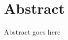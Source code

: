 \documentclass[thesis.tex]{subfiles}
\begin{document}
\null\vfill
{}
\chapter*{Abstract}
Abstract goes here

\vfill\vfill
\clearpage
\blankpage
\end{document}

